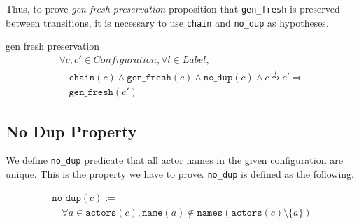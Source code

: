 
Thus, to prove \textit{gen fresh preservation} proposition that \texttt{gen\_fresh} is preserved between transitions, it is necessary to use \texttt{chain} and \texttt{no\_dup} as hypotheses.

\begin{lemma}{gen fresh preservation}
\begin{displaymath}
  \begin{array}{l}
    \forall c, c' \in \textit{Configuration}, \forall l \in \textit{Label}, \\
    \quad \texttt{chain}(c) \wedge \texttt{gen\_fresh}(c) \wedge \texttt{no\_dup}(c) \wedge c \overset{l}{\leadsto} c' \Rightarrow \\
    \quad \texttt{gen\_fresh}(c')
  \end{array}
\end{displaymath}
\end{lemma}

\subsection{No Dup Property}
We define \texttt{no\_dup} predicate that all actor names in the given configuration are unique.
This is the property we have to prove.
\texttt{no\_dup} is defined as the following.

\begin{displaymath}
  \begin{array}{l}
    \texttt{no\_dup}(c) := \\
    \quad \forall a \in \texttt{actors}(c), \texttt{name}(a) \notin
    \texttt{names}(\texttt{actors}(c) \setminus \{a\})
  \end{array}
\end{displaymath}

